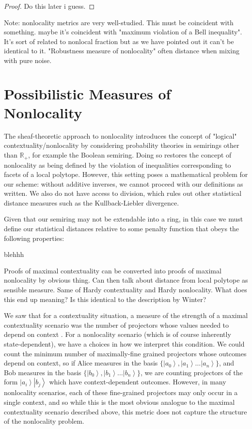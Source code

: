 \documentclass{amsart}
\theoremstyle{definition}
\newcommand{\ket}[1]{{\left\vert{#1}\right\rangle}}
\begin{document}
\begin{proof}
Do this later i guess.

\end{proof}

Note: nonlocality metrics are very well-studied. This must be coincident with something. maybe it's coincident with "maximum violation of a Bell inequality". It's sort of related to nonlocal fraction but as we have pointed out it can't be identical to it. "Robustness measure of nonlocality" often distance when mixing with pure noise.

\section{Possibilistic Measures of Nonlocality}

The sheaf-theoretic approach to nonlocality introduces the concept of "logical" contextuality/nonlocality by considering probability theories in semirings other than $\mathbb{R}_+$, for example the Boolean semiring. Doing so restores the concept of nonlocality as being defined by the violation of inequalities corresponding to facets of a local polytope. However, this setting poses a mathematical problem for our scheme: without additive inverses, we cannot proceed with our definitions as written. We also do not have access to division, which rules out other statistical distance measures such as the Kullback-Liebler divergence.

Given that our semiring may not be extendable into a ring, in this case we must define our statistical distances relative to some penalty function that obeys the following properties:

blehhh

Proofs of maximal contextuality can be converted into proofs of maximal nonlocality by obvious thing. Can then talk about distance from local polytope as sensible measure. Same of Hardy contextuality and Hardy nonlocality.
What does this end up meaning? Is this identical to the description by Winter?

We saw that for a contextuality situation, a measure of the strength of a maximal contextuality scenario was the number of projectors whose values needed to depend on context . For a nonlocality scenario (which is of course inherently state-dependent), we have a choices in how we interpret this condition. We could count the minimum number of maximally-fine grained projectors whose outcomes depend on context, so if Alice measures in the basis $\{\ket{a_0},\ket{a_1}\dots\ket{a_n}\}$, and Bob measures in the basis $\{\ket{b_0},\ket{b_1}\dots\ket{b_n}\}$, we are counting projectors of the form $\ket{a_i}\ket{b_j}$ which have context-dependent outcomes. However, in many nonlocality scenarios, each of these fine-grained projectors may only occur in a single context, and so while this is the most obvious analogue to the maximal contextuality scenario described above, this metric does not capture the structure of the nonlocality problem.
\end{document}
